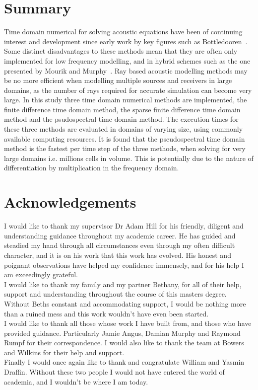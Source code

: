 
%
%
%

\chapter*{Summary}
Time domain numerical for solving acoustic equations have been of continuing interest and development since early work by key figures such as Bottledooren~\cite{Botteldooren1995}. Some distinct disadvantages to these methods mean that they are often only implemented for low frequency modelling, and in hybrid schemes such as the one presented by Mourik and Murphy~\cite{Mourik2014a}. Ray based acoustic modelling methods may be no more efficient when modelling multiple sources and receivers in large domains, as the number of rays required for accurate simulation can become very large. In this study three time domain numerical methods are implemented, the finite difference time domain method, the sparse finite difference time domain method and the psudospectral time domain method. The execution times for these three methods are evaluated in domains of varying size, using commonly available computing resources. It is found that the pseudospectral time domain method is the fastest per time step of the three methods, when solving for very large domains i.e. millions cells in volume. This is potentially due to the nature of differentiation by multiplication in the frequency domain.

\chapter*{Acknowledgements}

I would like to thank my supervisor Dr Adam Hill for his friendly, diligent and understanding guidance throughout my academic career. He has guided and steadied my hand through all circumstances even through my often difficult character, and it is on his work that this work has evolved. His honest and poignant observations have helped my confidence immensely, and for his help I am exceedingly grateful.\\

I would like to thank my family and my partner Bethany, for all of their help, support and understanding throughout the course of this masters degree. Without Beths constant and accommodating support, I would be nothing more than a ruined mess and this work wouldn't have even been started.\\

I would like to thank all those whose work I have built from, and those who have provided guidance. Particularly Jamie Angus, Damian Murphy and Raymond Rumpf for their correspondence. I would also like to thank the team at Bowers and Wilkins for their help and support.\\

Finally I would once again like to thank and congratulate William and Yasmin Draffin. Without these two people I would not have entered the world of academia, and I wouldn't be where I am today.